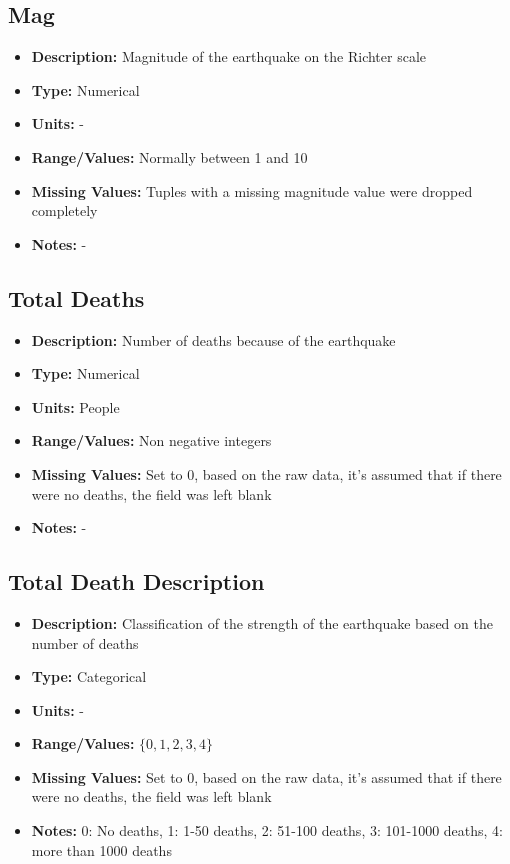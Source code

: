 \documentclass{article}
\begin{document}
\subsection{Mag}
\begin{itemize}
    \item \textbf{Description:} Magnitude of the earthquake on the Richter scale
    \item \textbf{Type:} Numerical
    \item \textbf{Units:} -
    \item \textbf{Range/Values:} Normally between 1 and 10
    \item \textbf{Missing Values:} Tuples with a missing magnitude value were dropped completely
    \item \textbf{Notes:} -
\end{itemize}

\subsection{Total Deaths}
\begin{itemize}
    \item \textbf{Description:} Number of deaths because of the earthquake
    \item \textbf{Type:} Numerical
    \item \textbf{Units:} People
    \item \textbf{Range/Values:} Non negative integers
    \item \textbf{Missing Values:} Set to 0, based on the raw data, it's assumed that if there were no deaths, the field was left blank
    \item \textbf{Notes:} -
\end{itemize}

\subsection{Total Death Description}
\begin{itemize}
    \item \textbf{Description:} Classification of the strength of the earthquake based on the number of deaths
    \item \textbf{Type:} Categorical
    \item \textbf{Units:} -
    \item \textbf{Range/Values:} $\{0,1,2,3,4 \}$
    \item \textbf{Missing Values:} Set to 0, based on the raw data, it's assumed that if there were no deaths, the field was left blank
    \item \textbf{Notes:} 0: No deaths, 1: 1-50 deaths, 2: 51-100 deaths, 3: 101-1000 deaths, 4: more than 1000 deaths
\end{itemize}
\end{document}
